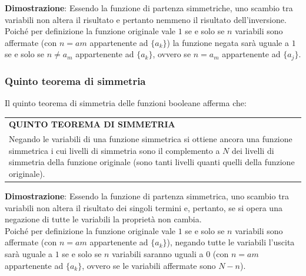 \documentclass[a4paper]{extarticle}
\renewcommand\arraystretch{}
\begin{document}
\vspace{1em}
\noindent
\textbf{Dimostrazione}: Essendo la funzione di partenza simmetriche, uno scambio tra variabili non altera il risultato e pertanto nemmeno il risultato dell'inversione.\\
Poiché per definizione la funzione originale vale $1$ se e solo se $n$ variabili sono affermate (con $n = am$ appartenente ad $\{a_k\}$) la funzione negata sarà uguale a $1$ se e solo se $n \neq a_m$ appartenente ad $\{a_k\}$, ovvero se $n=a_m$ appartenente ad $\{a_j\}$.

\vspace{1em}
\noindent
\subsubsection{Quinto teorema di simmetria}
Il quinto teorema di simmetria delle funzioni booleane afferma che:

\vspace{1em}
\setlength{\tabcolsep}{14pt}
\renewcommand{\arraystretch}{2}
\noindent
\begin{tabularx}{\textwidth}{@{}|P|@{}}
    \hline
    {\textbf{QUINTO TEOREMA DI SIMMETRIA}}\\
    \parbox{\linewidth}{Negando le variabili di una funzione simmetrica si ottiene ancora una funzione simmetrica i cui livelli di simmetria sono il complemento a $N$ dei livelli di simmetria della funzione originale (sono tanti
    livelli quanti quelli della funzione originale).
    \vspace{3mm}}\\
    \hline
\end{tabularx}

\vspace{1em}
\noindent
\textbf{Dimostrazione}: Essendo la funzione di partenza simmetrica, uno scambio tra variabili non altera il risultato dei singoli termini e, pertanto, se si opera una negazione di tutte le variabili la proprietà non cambia.\\
Poiché per definizione la funzione originale vale $1$ se e solo se $n$ variabili sono affermate (con $n = am$ appartenente ad $\{a_k\}$), negando tutte le variabili l'uscita sarà uguale a $1$ se e solo se $n$ variabili saranno uguali a $0$ (con $n = am$ appartenente ad $\{a_k\}$, ovvero se le variabili affermate sono
$N-n$).

\vspace{1em}
\noindent
\end{document}
